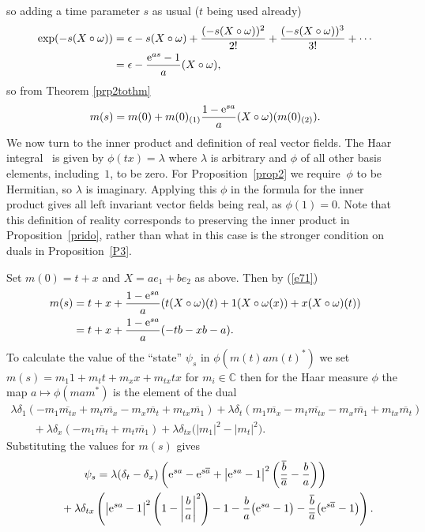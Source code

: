 \documentclass[pdftex]{sigma}
\numberwithin{equation}{section}
\newcommand{\C}{\mathbb{C}}
\newcommand{\<}{\langle}
\renewcommand{\>}{\rangle}
\begin{document}
so adding a time parameter $ s $ as usual ($ t $ being used already)
\begin{align*}
	\exp(-s(X \circ \omega))& = \epsilon-s (X \circ \omega)+\frac{(-s (X \circ \omega))^{2}}{2!}+\frac{(-s (X \circ \omega))^{3}}{3 !}+\cdots \\ & =\epsilon-\dfrac{{\rm e}^{as}-1}{a}(X \circ \omega),
\end{align*}
so from Theorem \ref{prp2tothm}
\begin{gather}\label{e71}
	m(s)=m(0)+ m(0)_{(1)} \dfrac{1-{\rm e}^{s a}}{a} (X \circ \omega)(m(0)_{(2)}).
\end{gather}
We now turn to the inner product and definition of real vector fields. The Haar integral~\cite{BMbook} is given by $ \phi (t x)= \lambda $ where $ \lambda $ is arbitrary and $ \phi $ of all other basis elements, including~$ 1 $, to be zero. For Proposition~\ref{prop2} we require $~\phi $ to be Hermitian, so $ \lambda $ is imaginary. Applying this $ \phi $ in the formula for the inner product gives all left invariant vector fields being real, as $ \phi (1)=0 $. Note that this definition of reality corresponds to preserving the inner product in Proposition~\ref{prido}, rather than what in this case is the stronger condition on duals in Proposition~\ref{P3}.
\begin{Example}
Set $ m(0)=t+x $ and $ X=a e_{1}+be_{2} $ as above. Then by (\ref{e71})
\begin{align*}%
	m(s)& =t+x+\dfrac{1-{\rm e}^{s a}}{a} (t (X \circ \omega) (t) +1 (X \circ \omega(x))+x (X \circ \omega)(t))\\
& =t+x+\dfrac{1-{\rm e}^{s a}}{a} (-tb -xb-a).
\end{align*}
To calculate the value of the ``state'' $ \psi_s $ in $ \phi(m(t) a m(t)^{*}) $ we set $ m(s)= m_{1} 1+m_{t} t +m_{x} x +m_{tx} tx $ for $ m _{i}\in \C $ then for the Haar measure $ \phi $ the map $ a \mapsto \phi(m a m^{*}) $ is the element of the dual
\begin{gather*}
	 \lambda \delta_{1} (-m _{1} \overline{m_{tx}} +m_{t} \overline{m_{x}}-m_{x} \overline{m_{t}}+m_{t x}\overline{m_{1}} )+ \lambda \delta_{t } (m _{1} \overline{m_{x}} -m_{t} \overline{m_{tx}}-m_{x} \overline{m_{1}}+m_{t x}\overline{m_{t}} ) \\
\qquad{} + \lambda \delta_{x} (-m _{1} \overline{m_{t}} +m_{t} \overline{m_{1}} ) +\lambda \delta_{tx} \big(|m _{1}|^{2} - |m _{t}|^{2} \big).
\end{gather*}
Substituting the values for $ m(s) $ gives
\begin{gather*}
	\psi_s = \lambda (\delta_{t} -\delta_{x} )\left({\rm e}^{sa}-{\rm e}^{s\overline{a}}+\big|{\rm e}^{sa}-1\big|^{2}\left(\frac{\overline{b}}{\overline{a}}-\frac{b}{a}\right)\right)\\
\hphantom{\psi_s =}{}
+\lambda \delta_{tx} \left(\big|{\rm e}^{sa}-1\big|^{2} \left(1-\left|\frac{b}{a}\right|^{2}\right)-1-\dfrac{b}{a} \big({\rm e}^{sa}-1\big)- \frac{\overline{b}}{\overline{a}}\big({\rm e}^{s\overline{a}}-1\big)\right).
\end{gather*}
\end{Example}
\end{document}

